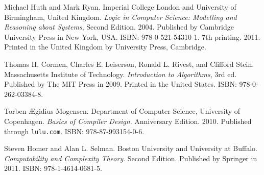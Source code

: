\begin{thebibliography}{9}
\backrefprint





Michael Huth and Mark Ryan. Imperial College London and University of
Birmingham, United Kingdom. \emph{Logic in Computer Science: Modelling and
Reasoning about Systems}, Second Edition. 2004. Published by Cambridge
University Press in New York, USA. ISBN: 978-0-521-54310-1. 7th printing.
2011.  Printed in the United Kingdom by University Press, Cambridge.

\backrefprint


Thomas H. Cormen, Charles E. Leiserson, Ronald L. Rivest, and Clifford Stein.
Massachusetts Institute of Technology.  \emph{Introduction to Algorithms}, 3rd
ed. Published by The MIT Press in 2009. Printed in the United States. ISBN:
978-0-262-03384-8.

\backrefprint


Torben Ægidius Mogensen. Department of Computer Science, University of
Copenhagen. \emph{Basics of Compiler Design}. Anniversary Edition. 2010.
Published through \texttt{lulu.com}. ISBN: 978-87-993154-0-6.

\backrefprint





Steven Homer and Alan L. Selman. Boston University and University at Buffalo.
\emph{Computability and Complexity Theory}. Second Edition. Published by
Springer in 2011. ISBN: 978-1-4614-0681-5.


\end{thebibliography}

